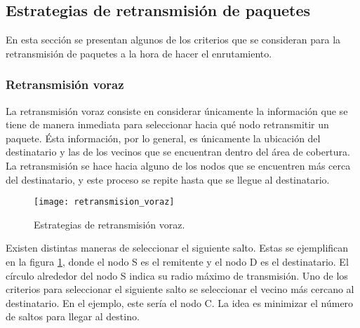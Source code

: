 
\subsection{Estrategias de retransmisión de paquetes}

\label{subsec:estrategias_de_retransmision_de_paquetes}

En esta sección se presentan algunos de los criterios que se consideran para la
retransmisión de paquetes a la hora de hacer el enrutamiento.

\subsubsection{Retransmisión voraz}

\label{subsubsec:retransmision_voraz}

La retransmisión voraz consiste en considerar únicamente la información que se
tiene de manera inmediata para seleccionar hacia qué nodo retransmitir un
paquete. Ésta información, por lo general, es únicamente la ubicación del
destinatario y las de los vecinos que se encuentran dentro del área de cobertura. La
retransmisión se hace hacia alguno de los nodos que se encuentren más cerca del
destinatario, y este proceso se repite hasta que se llegue al destinatario.

\begin{figure}[th]
\centering
\texttt{[image: retransmision\_voraz]}
\decoRule
\caption[Estrategias de retransmisión voraz]{Estrategias de retransmisión
voraz\protect\footnotemark.}
\label{fig:retransmision_voraz}
\end{figure}


Existen distintas maneras de seleccionar el siguiente salto. Estas se
ejemplifican en la figura \ref{fig:retransmision_voraz}, donde el nodo S es
el remitente y el nodo D es el destinatario. El círculo alrededor del nodo S
indica su radio máximo de transmisión. Uno de los criterios para seleccionar el
siguiente salto se seleccionar el vecino más cercano al destinatario. En el
ejemplo, este sería el nodo C. La idea es minimizar el número de saltos para
llegar al destino.


